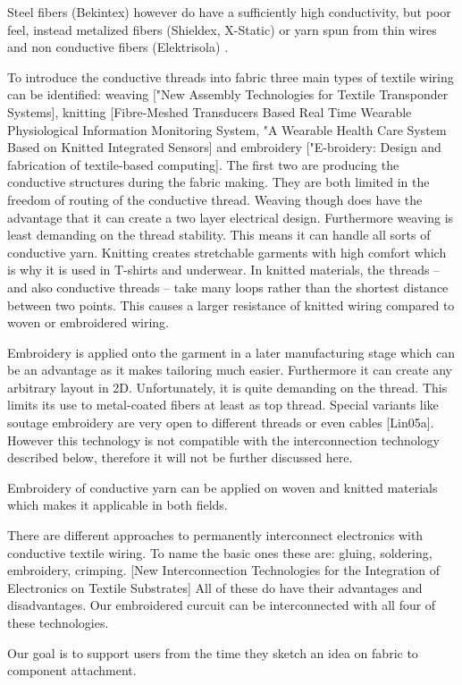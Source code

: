 Steel fibers (Bekintex) however do have a sufficiently high conductivity, but poor feel, instead metalized fibers (Shieldex, X-Static) or yarn spun from thin wires and non conductive fibers (Elektrisola) \cite{linz2008embroidered}.


To introduce the conductive threads into fabric three main types of textile wiring can be identified: weaving ["New Assembly Technologies for Textile Transponder Systems], knitting [Fibre-Meshed Transducers Based Real Time
Wearable Physiological Information Monitoring System, "A Wearable Health Care System Based on Knitted
Integrated Sensors] and embroidery ["E-broidery: Design and fabrication of textile-based computing]. The first two are producing the conductive structures during the fabric making. They are both limited in the freedom of routing of the conductive thread. Weaving though does have the advantage that it can create a two layer electrical design. Furthermore weaving is least demanding on the thread stability. This means it can handle all sorts of conductive yarn.
Knitting creates stretchable garments with high comfort which is why it is used in T-shirts and underwear. In knitted materials, the threads – and also conductive threads – take many loops rather than the shortest distance between two points. This causes a larger resistance of knitted wiring compared to woven or embroidered wiring.


Embroidery is applied onto the garment in a later manufacturing stage which can be an advantage as it makes tailoring much easier. Furthermore it can create any arbitrary layout in 2D. Unfortunately, it is quite demanding on the thread. This limits its use to metal-coated fibers at least as top thread. Special variants like soutage embroidery are very open to different threads or even cables [Lin05a]. However this technology is not compatible with the interconnection technology described below, therefore it will not be further discussed here.

Embroidery of conductive yarn can be applied on woven and knitted materials which makes it applicable in both fields.


There are different approaches to permanently interconnect electronics with conductive textile wiring. To name the basic ones these are: gluing, soldering, embroidery, crimping. [New Interconnection Technologies for the Integration of
Electronics on Textile Substrates] All of these do have their advantages and disadvantages. Our embroidered curcuit can be interconnected with all four of these technologies.

Our goal is to support users from the time they sketch an idea on fabric to component attachment.